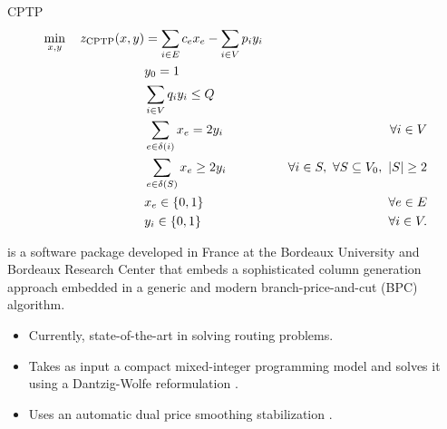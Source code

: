\begin{frame}{CPTP}
	\begin{align}
		\min_{x,y} \quad z_\mt{CPTP}(x, y) & = \ExprCptpObjValDef                     & \label{eq:cptp-obj-function}                                                                          \\
		                                   & y_0 = 1                                  & \label{eq:cptp-depot-part-of-tour-constraint}                                                         \\
		                                   & \ExprCptpDemandSum  \le Q                & \label{eq:cptp-resource-upper-bound-constraint}                                                       \\
		                                   & \ExprCptpEdgesIncident{i}  = 2 y_i       & \quad \forall i \in V         \label{eq:cptp-flow-conservation-constraint}                            \\
		                                   & \ExprCptpFlowExiting{S} \ge 2 y_{i}      & \quad \forall i \in S,\ \forall S \subseteq V_0,\ \SetSize*{S} \ge 2 \label{eq:cptp-gsec-constraints} \\
		                                   & x_{e}                   \in \Set*{0, 1}  & \quad \forall e \in E               \label{eq:cptp-x-mip-var-bounds}                                  \\
		                                   & y_{i}                    \in \Set*{0, 1} & \quad \forall i \in V             \label{eq:cptp-y-mip-var-bounds}.
	\end{align}
\end{frame}

\begin{frame}{\bapcod{}}
	\bapcod{} \parencite{sadykov2021} is a software package
	developed in France at the Bordeaux University and Bordeaux Research Center
	that embeds a sophisticated column generation approach
	embedded in a generic and modern branch-price-and-cut (BPC) algorithm.

	\begin{itemize}
		\item Currently, state-of-the-art in solving routing problems.
		\item Takes as input a compact mixed-integer programming model and solves it using a Dantzig-Wolfe reformulation \parencite{dantzig1960}.
		\item Uses an automatic dual price smoothing stabilization \parencite{pessoa2018automation}.
	\end{itemize}
\end{frame}

